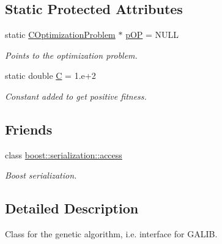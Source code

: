 \subsection*{Static Protected Attributes}
\begin{DoxyCompactItemize}
\item 
static \hyperlink{class_c_optimization_problem}{C\-Optimization\-Problem} $\ast$ \hyperlink{class_c_g_a_model_optimization_a6b925befb13a952f6f8bae588cce6106}{p\-O\-P} = N\-U\-L\-L
\begin{DoxyCompactList}\small\item\em Points to the optimization problem. \end{DoxyCompactList}\item 
static double \hyperlink{class_c_g_a_model_optimization_ab1915d63ecd7b920e93e3171724f3e71}{C} = 1.e+2
\begin{DoxyCompactList}\small\item\em Constant added to get positive fitness. \end{DoxyCompactList}\end{DoxyCompactItemize}
\subsection*{Friends}
\begin{DoxyCompactItemize}
\item 
class \hyperlink{class_c_g_a_model_optimization_ac98d07dd8f7b70e16ccb9a01abf56b9c}{boost\-::serialization\-::access}
\begin{DoxyCompactList}\small\item\em Boost serialization. \end{DoxyCompactList}\end{DoxyCompactItemize}


\subsection{Detailed Description}
Class for the genetic algorithm, i.\-e. interface for G\-A\-L\-I\-B. 

